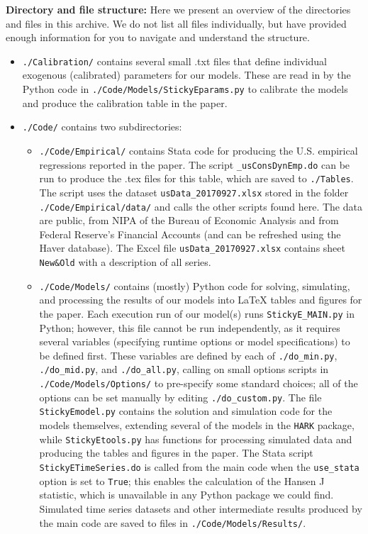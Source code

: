 \documentclass[12pt,pdftex,letterpaper]{article}
\begin{document}
\vspace{0.5cm}

\noindent \textbf{Directory and file structure:} Here we present an overview of the directories and files in this archive.  We do not list all files individually, but have provided enough information for you to navigate and understand the structure.
\begin{itemize}

\item \texttt{./Calibration/} contains several small .txt files that define individual exogenous (calibrated) parameters for our models.  These are read in by the Python code in \texttt{./Code/Models/StickyEparams.py} to calibrate the models and produce the calibration table in the paper.

\item \texttt{./Code/} contains two subdirectories:

\begin{itemize}

\item \texttt{./Code/Empirical/} contains Stata code for producing the U.S. empirical regressions reported in the paper.  The script \texttt{\_usConsDynEmp.do} can be run to produce the .tex files for this table, which are saved to \texttt{./Tables}.  The script uses the dataset \texttt{usData\_20170927.xlsx} stored in the folder \texttt{./Code/Empirical/data/} and calls the other scripts found here.  The data are public, from NIPA of the Bureau of Economic Analysis and from Federal Reserve's Financial Accounts (and can be refreshed using the Haver database). The Excel file \texttt{usData\_20170927.xlsx} contains sheet \texttt{New\&Old} with a description of all series.

\item \texttt{./Code/Models/} contains (mostly) Python code for solving, simulating, and processing the results of our models into LaTeX tables and figures for the paper.  Each execution run of our model(s) runs \texttt{StickyE\_MAIN.py} in Python; however, this file cannot be run independently, as it requires several variables (specifying runtime options or model specifications) to be defined first.  These variables are defined by each of \texttt{./do\_min.py}, \texttt{./do\_mid.py}, and \texttt{./do\_all.py}, calling on small options scripts in \texttt{./Code/Models/Options/} to pre-specify some standard choices; all of the options can be set manually by editing \texttt{./do\_custom.py}.  The file \texttt{StickyEmodel.py} contains the solution and simulation code for the models themselves, extending several of the models in the \texttt{HARK} package, while \texttt{StickyEtools.py} has functions for processing simulated data and producing the tables and figures in the paper.  The Stata script \texttt{StickyETimeSeries.do} is called from the main code when the \texttt{use\_stata} option is set to \texttt{True}; this enables the calculation of the Hansen J statistic, which is unavailable in any Python package we could find.  Simulated time series datasets and other intermediate results produced by the main code are saved to files in \texttt{./Code/Models/Results/}.


\end{itemize}
\end{itemize}
\end{document}
